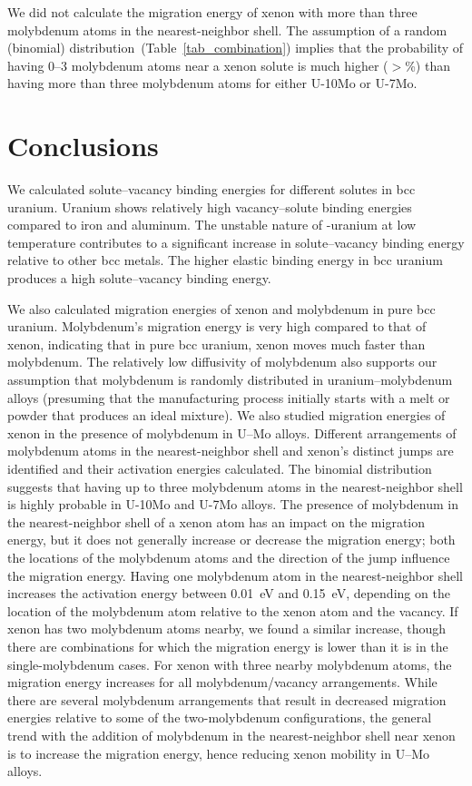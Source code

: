We did not calculate the migration energy of xenon with more than three
molybdenum atoms in the nearest-neighbor shell.
The assumption of a random (binomial)
distribution~(Table~\ref{tab_combination}) implies that the
probability of having 0--3 molybdenum atoms near a xenon solute is much higher
($>$\%) than having more than three molybdenum atoms for either
U-10Mo or U-7Mo.

\section{Conclusions}
We calculated solute--vacancy binding energies for different solutes in bcc
uranium. Uranium shows relatively high vacancy--solute binding energies compared to iron and aluminum. The unstable nature of \textgamma-uranium at low temperature contributes to a significant increase in solute--vacancy binding energy relative to other bcc metals. The higher elastic binding energy in bcc uranium produces a high solute--vacancy binding energy.

We also calculated migration energies of xenon and molybdenum in pure bcc
uranium. Molybdenum's migration energy is very high compared to that of xenon,
indicating that in pure bcc uranium, xenon moves much faster than molybdenum.
The relatively low diffusivity of molybdenum also supports our assumption that
molybdenum is randomly distributed in uranium--molybdenum alloys
(presuming that the manufacturing process initially starts with a melt or
powder that produces an ideal mixture).
We also studied migration energies of xenon in the presence of molybdenum in
\mbox{U--Mo} alloys.
Different arrangements of molybdenum atoms in the nearest-neighbor shell and
xenon's distinct jumps are identified and their activation energies calculated.
The binomial distribution suggests that having up to three molybdenum atoms in
the nearest-neighbor shell is highly probable in U-10Mo and U-7Mo alloys.
The presence of molybdenum in the nearest-neighbor shell of a xenon atom has
an impact on the migration energy, but it does not generally increase or
decrease the migration energy; both the locations of the molybdenum atoms and
the direction of the jump influence the migration energy.
Having one molybdenum atom in the nearest-neighbor shell increases the
activation energy between 0.01~eV and 0.15~eV, depending on the location of
the molybdenum atom relative to the xenon atom and the vacancy.
If xenon has two molybdenum atoms nearby, we found a similar increase,
though there are combinations for which the migration energy is lower than it
is in the single-molybdenum cases.
For xenon with three nearby molybdenum atoms,
the migration energy increases for all molybdenum/\allowbreak{}vacancy
arrangements.
While there are several molybdenum arrangements that result in decreased
migration energies relative to some of the two-molybdenum configurations,
the general trend with the addition of molybdenum in the nearest-neighbor
shell near xenon is to increase the migration energy, hence reducing xenon
mobility in \mbox{U--Mo} alloys.
 
